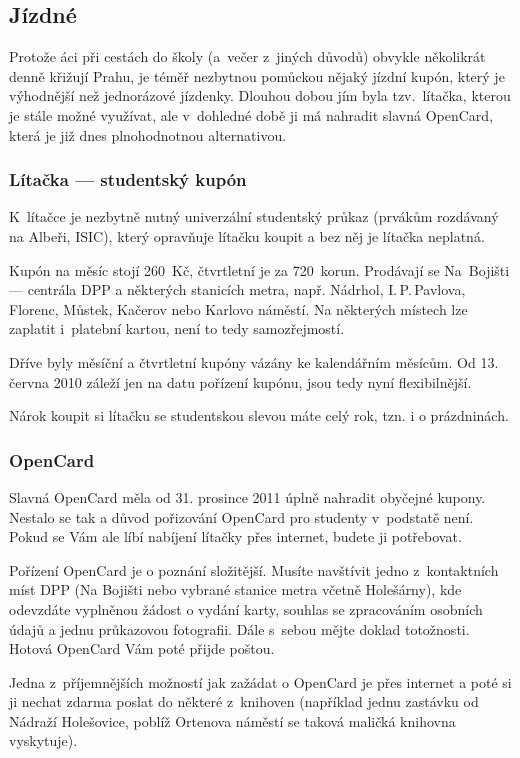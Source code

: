 \subsection{Jízdné}

Protože \mfz{}áci při cestách do školy (a~večer z~jiných důvodů)
obvykle několikrát denně křižují Prahu, je téměř nezbytnou
pomůckou nějaký jízdní kupón, který je výhodnější než jednorázové
jízdenky. Dlouhou dobou jím byla tzv.~lítačka, kterou je stále
možné využívat, ale v~dohledné době ji má nahradit slavná
OpenCard, která je již dnes plnohodnotnou alternativou.

\subsubsection{Lítačka --- studentský kupón}

K~lítačce je nezbytně nutný univerzální studentský průkaz
(prvákům rozdávaný na Albeři, ISIC), který opravňuje lítačku
koupit a bez něj je lítačka neplatná. 

Kupón na měsíc stojí 260~Kč, čtvrtletní je za 720~korun.
Prodávají se Na~Bojišti --- centrála DPP a některých stanicích
metra, např. Nádrhol, I.$\,$P.$\,$Pavlova, Florenc, Můstek,
Kačerov nebo Karlovo náměstí. Na některých místech lze zaplatit
i~platební kartou, není to tedy samozřejmostí.

Dříve byly měsíční a čtvrtletní kupóny vázány ke kalendářním
měsícům. Od 13. června 2010 záleží jen na datu pořízení kupónu,
jsou tedy nyní flexibilnější.

Nárok koupit si lítačku se studentskou slevou máte celý rok,
tzn. i o prázdninách.


\subsubsection{OpenCard}

Slavná OpenCard měla od 31. prosince 2011 úplně nahradit obyčejné kupony. Nestalo se tak a důvod pořizování OpenCard pro studenty v~podstatě není. Pokud se Vám ale líbí nabíjení lítačky přes internet, budete ji potřebovat.

Pořízení OpenCard je o poznání složitější. Musíte navštívit jedno z~kontaktních míst DPP (Na Bojišti nebo vybrané stanice metra včetně Holešárny), kde odevzdáte vyplněnou žádost o vydání karty, souhlas se zpracováním osobních údajů a jednu průkazovou fotografii. Dále s~sebou mějte doklad totožnosti. Hotová OpenCard Vám poté přijde poštou.

Jedna z~příjemnějších možností jak zažádat o OpenCard je přes internet a poté si ji nechat zdarma poslat do některé z~knihoven (například jednu zastávku od Nádraží Holešovice, poblíž Ortenova náměstí se taková maličká knihovna vyskytuje).

